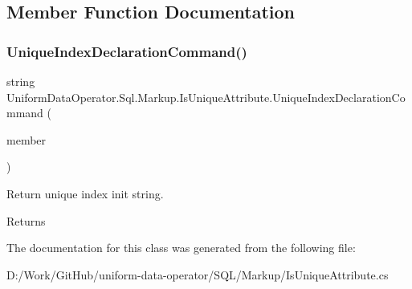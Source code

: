 \subsection{Member Function Documentation}
\mbox{\label{class_uniform_data_operator_1_1_sql_1_1_markup_1_1_is_unique_attribute_abe2b67c5dd704a30acfb0a2f55d8f858}} 
\subsubsection{\texorpdfstring{Unique\+Index\+Declaration\+Command()}{UniqueIndexDeclarationCommand()}}
{\footnotesize\ttfamily string Uniform\+Data\+Operator.\+Sql.\+Markup.\+Is\+Unique\+Attribute.\+Unique\+Index\+Declaration\+Command (\begin{DoxyParamCaption}\item[{Member\+Info}]{member }\end{DoxyParamCaption})}



Return unique index init string. 

\begin{DoxyReturn}{Returns}

\end{DoxyReturn}


The documentation for this class was generated from the following file\+:\begin{DoxyCompactItemize}
\item 
D\+:/\+Work/\+Git\+Hub/uniform-\/data-\/operator/\+S\+Q\+L/\+Markup/Is\+Unique\+Attribute.\+cs\end{DoxyCompactItemize}
